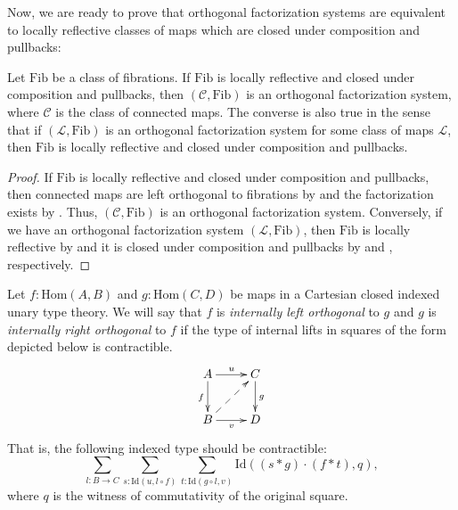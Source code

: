 \documentclass[reqno]{mscs}
\newcommand{\fs}[1]{\mathrm{#1}}
\newcommand{\Hom}{\fs{Hom}}
\newcommand{\Id}{\fs{Id}}
\newcommand{\Fib}{\fs{Fib}}
\numberwithin{figure}{section}
\begin{document}
Now, we are ready to prove that orthogonal factorization systems are equivalent to locally reflective classes of maps which are closed under composition and pullbacks:

\begin{thm}
Let $\Fib$ be a class of fibrations.
If $\Fib$ is locally reflective and closed under composition and pullbacks, then $(\mathcal{C},\Fib)$ is an orthogonal factorization system, where $\mathcal{C}$ is the class of connected maps.
The converse is also true in the sense that if $(\mathcal{L},\Fib)$ is an orthogonal factorization system for some class of maps $\mathcal{L}$, then $\Fib$ is locally reflective and closed under composition and pullbacks.
\end{thm}
\begin{proof}
If $\Fib$ is locally reflective and closed under composition and pullbacks, then connected maps are left orthogonal to fibrations by  and the factorization exists by .
Thus, $(\mathcal{C},\Fib)$ is an orthogonal factorization system.
Conversely, if we have an orthogonal factorization system $(\mathcal{L},\Fib)$, then $\Fib$ is locally reflective by  and it is closed under composition and pullbacks by  and , respectively.
\end{proof}

\begin{defn}
Let $f : \Hom(A,B)$ and $g : \Hom(C,D)$ be maps in a Cartesian closed indexed unary type theory.
We will say that $f$ is \emph{internally left orthogonal} to $g$ and $g$ is \emph{internally right orthogonal} to $f$ if the type of internal lifts in squares of the form depicted below is contractible.
\[ \xymatrix{ A \ar[r]^u \ar[d]_f       & C \ar[d]^g \\
              B \ar[r]_v \ar@{-->}[ur]  & D
            } \]
That is, the following indexed type should be contractible:
\[ \sum_{l : B \to C} \sum_{s : \Id(u, l \circ f)} \sum_{t : \Id(g \circ l, v)} \Id((s * g) \cdot (f * t), q), \]
where $q$ is the witness of commutativity of the original square.
\end{defn}
\end{document}
